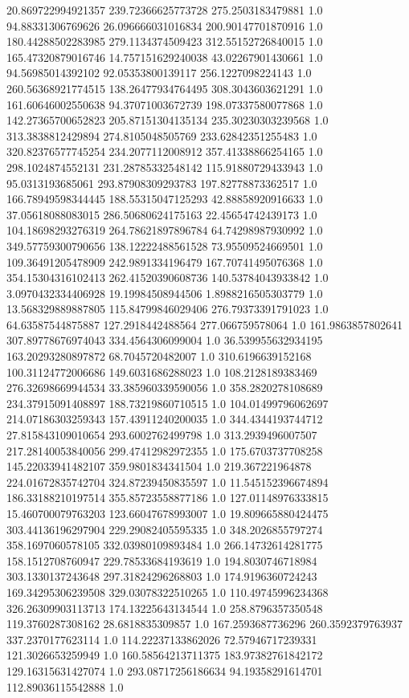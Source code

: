 20.869722994921357	239.72366625773728	275.2503183479881	1.0
94.88331306769626	26.096666031016834	200.90147701870916	1.0
180.44288502283985	279.1134374509423	312.55152726840015	1.0
165.47320879016746	14.757151629240038	43.02267901430661	1.0
94.56985014392102	92.05353800139117	256.1227098224143	1.0
260.56368921774515	138.26477934764495	308.3043603621291	1.0
161.60646002550638	94.37071003672739	198.07337580077868	1.0
142.27365700652823	205.87151304135134	235.30230303239568	1.0
313.3838812429894	274.8105048505769	233.62842351255483	1.0
320.82376577745254	234.2077112008912	357.41338866254165	1.0
298.1024874552131	231.28785332548142	115.91880729433943	1.0
95.0313193685061	293.87908309293783	197.82778873362517	1.0
166.78949598344445	188.55315047125293	42.88858920916633	1.0
37.05618088083015	286.50680624175163	22.45654742439173	1.0
104.18698293276319	264.78621897896784	64.74298987930992	1.0
349.57759300790656	138.12222488561528	73.95509524669501	1.0
109.36491205478909	242.9891334196479	167.70741495076368	1.0
354.15304316102413	262.41520390608736	140.53784043933842	1.0
3.0970432334406928	19.19984508944506	1.8988216505303779	1.0
13.568329889887805	115.84799846029406	276.79373391791023	1.0
64.63587544875887	127.2918442488564	277.066759578064	1.0
161.9863857802641	307.89778676974043	334.4564306099004	1.0
36.539955632934195	163.20293280897872	68.7045720482007	1.0
310.6196639152168	100.31124772006686	149.6031686288023	1.0
108.2128189383469	276.32698669944534	33.385960339590056	1.0
358.2820278108689	234.37915091408897	188.73219860710515	1.0
104.01499796062697	214.07186303259343	157.43911240200035	1.0
344.4344193744712	27.815843109010654	293.6002762499798	1.0
313.2939496007507	217.28140053840056	299.47412982972355	1.0
175.6703737708258	145.22033941482107	359.9801834341504	1.0
219.367221964878	224.01672835742704	324.87239450835597	1.0
11.545152396674894	186.33188210197514	355.85723558877186	1.0
127.01148976333815	15.460700079763203	123.66047678993007	1.0
19.809665880424475	303.44136196297904	229.29082405595335	1.0
348.2026855797274	358.1697060578105	332.03980109893484	1.0
266.14732614281775	158.1512708760947	229.78533684193619	1.0
194.8030746718984	303.1330137243648	297.31824296268803	1.0
174.9196360724243	169.34295306239508	329.03078322510265	1.0
110.49745996234368	326.26309903113713	174.13225643134544	1.0
258.8796357350548	119.3760287308162	28.6818835309857	1.0
167.2593687736296	260.3592379763937	337.2370177623114	1.0
114.22237133862026	72.57946717239331	121.3026653259949	1.0
160.58564213711375	183.97382761842172	129.16315631427074	1.0
293.08717256186634	94.19358291614701	112.89036115542888	1.0
